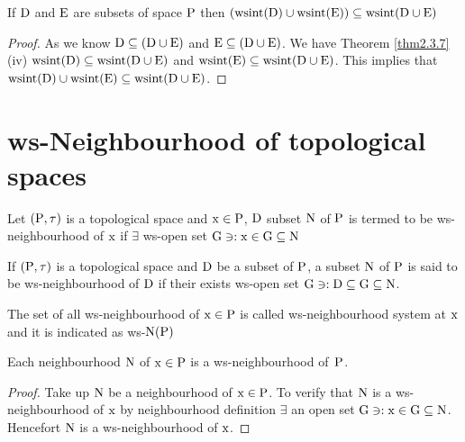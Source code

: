 \begin{thm}\label{thm2.4.6}
If $\mathrm{D}$ and $\mathrm{E}$ are subsets of space $\mathrm{P}$ then $(\mathrm{wsint}(\mathrm{D})\cup \mathrm{wsint}(\mathrm{E}))\subseteq \mathrm{wsint}(\mathrm{D}\cup \mathrm{E})$
\end{thm}

\begin{proof}
As we know $\mathrm{D}\subseteq (\mathrm{D}\cup \mathrm{E})$ and $\mathrm{E}\subseteq (\mathrm{D}\cup \mathrm{E})$. We have Theorem \ref{thm2.3.7} (iv) $\mathrm{wsint}(\mathrm{D})\subseteq \mathrm{wsint}(\mathrm{D}\cup \mathrm{E})$ and $\mathrm{wsint}(\mathrm{E})\subseteq \mathrm{wsint}(\mathrm{D}\cup \mathrm{E})$. This implies that $\mathrm{wsint}(\mathrm{D})\cup \mathrm{wsint}(\mathrm{E})\subseteq \mathrm{wsint}(\mathrm{D}\cup \mathrm{E})$.
\end{proof}


\section{ws-Neighbourhood of topological spaces}\label{sec2.5}

\begin{dfn}\label{defi2.5.1}
Let $(\mathrm{P}, \tau)$ is a topological space and $\mathrm{x}\in \mathrm{P}$, $\mathrm{D}$ subset $\mathrm{N}$ of $\mathrm{P}$ is termed to be ws-neighbourhood of $\mathrm{x}$ if $\exists$ ws-open set $\mathrm{G} \ni: \mathrm{x}\in \mathrm{G}\subseteq \mathrm{N}$
\end{dfn}

\begin{dfn}\label{defi2.5.2}
If $(\mathrm{P}, \tau)$ is a topological space and $\mathrm{D}$ be a subset of $\mathrm{P}$, a subset $\mathrm{N}$ of $\mathrm{P}$ is said to be ws-neighbourhood of $\mathrm{D}$ if their exists ws-open set $\mathrm{G} \ni: \mathrm{D}\subseteq \mathrm{G}\subseteq \mathrm{N}$.
\end{dfn}

\begin{dfn}\label{defi2.5.3}
The set of all ws-neighbourhood of $\mathrm{x}\in \mathrm{P}$ is called ws-neighbourhood system at $\mathrm{x}$ and it is indicated as ws-$\mathrm{N}(\mathrm{P})$
\end{dfn}

\begin{thm}\label{thm2.5.4}
Each neighbourhood $\mathrm{N}$ of $\mathrm{x}\in \mathrm{P}$ is a ws-neighbourhood of~$\mathrm{P}$.
\end{thm}

\begin{proof}
Take up $\mathrm{N}$ be a neighbourhood of $\mathrm{x}\in \mathrm{P}$. To verify that $\mathrm{N}$ is a ws-neighbour\-hood of $\mathrm{x}$ by neighbourhood definition $\exists$ an open set $\mathrm{G} \ni: \mathrm{x}\in \mathrm{G}\subseteq \mathrm{N}$. Hencefort $\mathrm{N}$ is a ws-neighbourhood of $\mathrm{x}$.
\end{proof}

